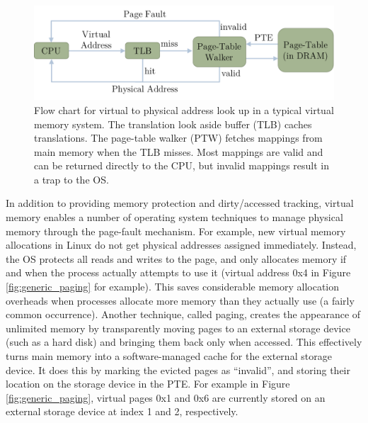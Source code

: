 \begin{figure}[h]
    \centering
    \includegraphics[width=0.9\columnwidth]{figs/generic_paging.pdf}
    \caption{Flow chart for virtual to physical address look up in a typical
      virtual memory system. The translation look aside buffer (TLB) caches
      translations. The page-table walker (PTW) fetches mappings from main
      memory when the TLB misses. Most mappings are valid and can be returned
      directly to the CPU, but invalid mappings result in a trap to the OS.}
    \label{fig:generic_paging_flow}
\end{figure}

In addition to providing memory protection and dirty/accessed tracking, virtual
memory enables a number of operating system techniques to manage physical
memory through the page-fault mechanism. For example, new virtual memory
allocations in Linux do not get physical addresses assigned immediately.
Instead, the OS protects all reads and writes to the page, and only allocates
memory if and when the process actually attempts to use it (virtual address 0x4
in Figure \ref{fig:generic_paging} for example). This saves considerable memory
allocation overheads when processes allocate more memory than they actually use
(a fairly common occurrence). Another technique, called paging, creates the
appearance of unlimited memory by transparently moving pages to an external
storage device (such as a hard disk) and bringing them back only when accessed.
This effectively turns main memory into a software-managed cache for the
external storage device. It does this by marking the evicted pages as
``invalid'', and storing their location on the storage device in the PTE. For
example in Figure \ref{fig:generic_paging}, virtual pages 0x1 and 0x6 are
currently stored on an external storage device at index 1 and 2, respectively.

